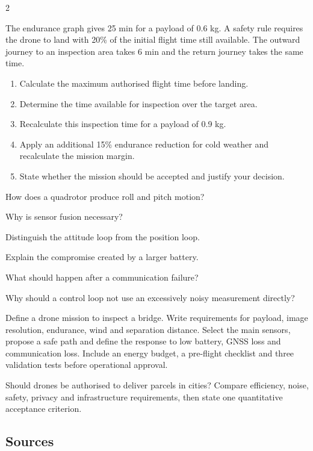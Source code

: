 \begin{multicols}{2}
\begin{applicationexercise}
The endurance graph gives 25 min for a payload of 0.6 kg. A safety rule requires the drone to land
with 20\% of the initial flight time still available. The outward journey to an inspection area takes
6 min and the return journey takes the same time.
\begin{enumerate}
\item Calculate the maximum authorised flight time before landing.
\item Determine the time available for inspection over the target area.
\item Recalculate this inspection time for a payload of 0.9 kg.
\item Apply an additional 15\% endurance reduction for cold weather and recalculate the mission margin.
\item State whether the mission should be accepted and justify your decision.
\end{enumerate}
\end{applicationexercise}

\begin{questions}
\item How does a quadrotor produce roll and pitch motion?
\item Why is sensor fusion necessary?
\item Distinguish the attitude loop from the position loop.
\item Explain the compromise created by a larger battery.
\item What should happen after a communication failure?
\item Why should a control loop not use an excessively noisy measurement directly?
\end{questions}

\begin{engineeringchallenge}
Define a drone mission to inspect a bridge. Write requirements for payload, image resolution,
endurance, wind and separation distance. Select the main sensors, propose a safe path and define the
response to low battery, GNSS loss and communication loss. Include an energy budget, a pre-flight
checklist and three validation tests before operational approval.
\end{engineeringchallenge}

\begin{speaking}
Should drones be authorised to deliver parcels in cities? Compare efficiency, noise, safety, privacy
and infrastructure requirements, then state one quantitative acceptance criterion.
\end{speaking}
\end{multicols}

\subsection*{Sources}

